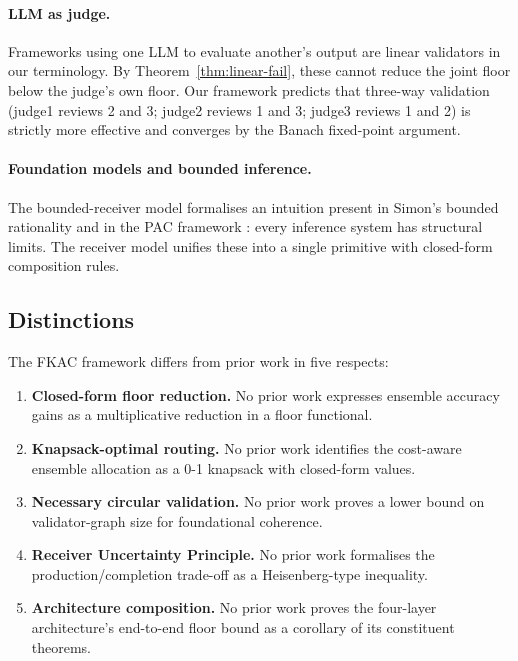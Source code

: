 \documentclass[11pt,twocolumn,a4paper]{article}
\theoremstyle{definition}
\theoremstyle{remark}
\begin{document}
\paragraph{LLM as judge.} Frameworks using one LLM to evaluate another's output \citep{zheng2023judging} are linear validators in our terminology. By Theorem~\ref{thm:linear-fail}, these cannot reduce the joint floor below the judge's own floor. Our framework predicts that three-way validation (judge1 reviews 2 and 3; judge2 reviews 1 and 3; judge3 reviews 1 and 2) is strictly more effective and converges by the Banach fixed-point argument.

\paragraph{Foundation models and bounded inference.} The bounded-receiver model formalises an intuition present in Simon's bounded rationality \citep{simon1956rational,simon1957models} and in the PAC framework \citep{valiant1984theory,vapnik1998statistical}: every inference system has structural limits. The receiver model unifies these into a single primitive with closed-form composition rules.

\subsection{Distinctions}

The FKAC framework differs from prior work in five respects:

\begin{enumerate}[leftmargin=*,nosep]
\item \textbf{Closed-form floor reduction.} No prior work expresses ensemble accuracy gains as a multiplicative reduction in a floor functional.
\item \textbf{Knapsack-optimal routing.} No prior work identifies the cost-aware ensemble allocation as a 0-1 knapsack with closed-form values.
\item \textbf{Necessary circular validation.} No prior work proves a lower bound on validator-graph size for foundational coherence.
\item \textbf{Receiver Uncertainty Principle.} No prior work formalises the production/completion trade-off as a Heisenberg-type inequality.
\item \textbf{Architecture composition.} No prior work proves the four-layer architecture's end-to-end floor bound as a corollary of its constituent theorems.
\end{enumerate}
\end{document}
